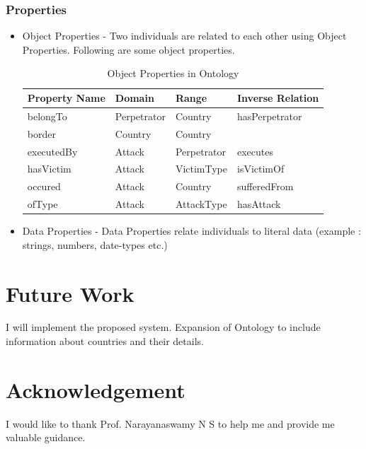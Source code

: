 \documentclass[journal,onecolumn,11pt]{IEEEtran}
\begin{document}
\subsubsection{Properties}
\begin{itemize}
\item Object Properties - Two individuals are related to each other using Object Properties. Following are some object properties.
\begin{table}[h!]
\centering
\fontsize{11}{9}\selectfont
\bgroup
\def\arraystretch{1.5}

\begin{tabular}{|l|l|l|l|}
\hline
\textbf{Property Name} & \textbf{Domain} & \textbf{Range} & \textbf{Inverse Relation} \\ \hline
belongTo & Perpetrator & Country & hasPerpetrator \\ \hline
border & Country & Country &  \\ \hline
executedBy & Attack & Perpetrator & executes \\ \hline
hasVictim & Attack & VictimType & isVictimOf \\ \hline
occured & Attack & Country & sufferedFrom \\ \hline
ofType & Attack & AttackType & hasAttack \\ \hline
\end{tabular}
\caption{Object Properties in Ontology}
\egroup
\end{table}
\item Data Properties - Data Properties relate individuals  to literal data (example : strings, numbers, date-types etc.)
\end{itemize}
\newpage
\section{Future Work}
I will implement the proposed system. Expansion of Ontology to include information about countries and their details.
\label{future}
\section{Acknowledgement}
I would like to thank Prof. Narayanaswamy N S to help me and provide me valuable guidance.



\ifCLASSOPTIONcaptionsoff
  \newpage
\fi
\end{document}
